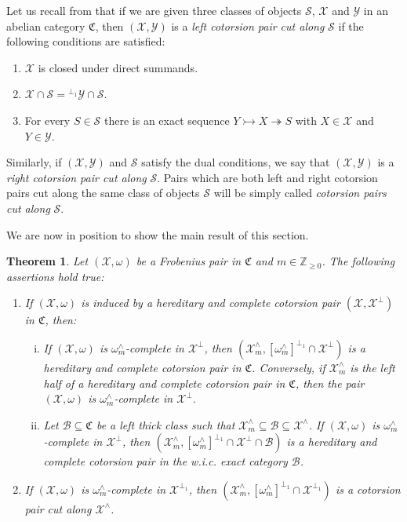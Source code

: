 \documentclass[10pt,reqno]{amsart}
\numberwithin{equation}{section}
\newtheorem{theorem}[definition]{Theorem}
\theoremstyle{remark}
\newcommand{\C}{\mathfrak{C}}
\newcommand{\X}{\mathcal{X}}
\begin{document}
Let us recall from \cite[Def. 2.1]{HMP-cut} that if we are given three classes of objects $\mathcal{S}$, $\mathcal{X}$ and $\mathcal{Y}$ in an abelian category $\mathfrak{C}$, then $(\mathcal{X,Y})$ is a \emph{left cotorsion pair cut along} $\mathcal{S}$ if the following conditions are satisfied:
\begin{enumerate}
\item[{\sf (LCCP1)}] $\mathcal{X}$ is closed under direct summands.

\item[{\sf (LCCP2)}] $\mathcal{X} \cap \mathcal{S} = {}^{\perp_1}\mathcal{Y} \cap \mathcal{S}$.

\item[{\sf (LCCP3)}] For every $S \in \mathcal{S}$ there is an exact sequence $Y \rightarrowtail X \twoheadrightarrow S$ with $X \in \mathcal{X}$ and $Y \in \mathcal{Y}$.
\end{enumerate}
Similarly, if $(\mathcal{X,Y})$ and $\mathcal{S}$ satisfy the dual conditions, we say that $(\mathcal{X,Y})$ is a \emph{right cotorsion pair cut along} $\mathcal{S}$. Pairs which are both left and right cotorsion pairs cut along the same class of objects $\mathcal{S}$ will be simply called \emph{cotorsion pairs cut along} $\mathcal{S}$.


We are now in position to show the main result of this section.
 
 
\begin{theorem} \label{Family}
Let $(\mathcal{X},\omega)$ be a Frobenius pair in $\mathfrak{C}$ and $m \in \mathbb{Z}_{\geq 0}$. The following assertions hold true:
\begin{enumerate}[(1)]
\item If $(\mathcal{X},\omega)$ is induced by a hereditary and complete cotorsion pair $(\mathcal{X},\mathcal{X}^{\perp})$ in $\mathfrak{C}$, then: 
\begin{enumerate}[(i)]
\item If $(\X, \omega)$ is $\omega^{\wedge}_m$-complete in $\X^{\perp}$, then $(\X^{\wedge}_m, [\omega^{\wedge}_m]^{\perp_1} \cap \X^\perp)$ is a hereditary and complete cotorsion pair in $\C$. Conversely, if $\X^{\wedge}_m$ is the left half of a hereditary and complete cotorsion pair in $\C$, then the pair $(\X,\omega)$ is $\omega^{\wedge}_m$-complete in $\X^{\perp}$.

\item Let $\mathcal{B} \subseteq \mathfrak{C}$ be a left thick class such that $\X^{\wedge}_m \subseteq \mathcal{B} \subseteq \X^{\wedge}$. If $(\X, \omega)$ is $\omega^{\wedge}_m$-complete in $\X^\perp$, then $(\X^{\wedge}_m, [\omega^{\wedge}_m]^{\perp_1} \cap \X^{\perp} \cap \mathcal{B})$ is a hereditary and complete cotorsion pair in the w.i.c. exact category $\mathcal{B}$.
\end{enumerate}

\item If $(\X , \omega)$ is $\omega^{\wedge}_m$-complete in $\X^{\perp_1}$, then $(\X^\wedge_m, [\omega^{\wedge}_m]^{\perp_1} \cap \X^{\perp_1})$ is a cotorsion pair cut along $\X^{\wedge}$. \\
\end{enumerate} 
\end{theorem}
\end{document}

